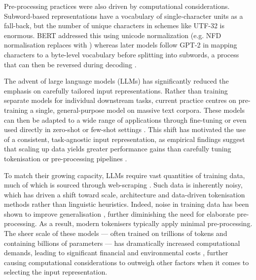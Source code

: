 Pre-processing practices were also driven by computational considerations. Subword-based representations have a vocabulary of single-character units as a fall-back, but the number of unique characters in schemes like UTF-32 is enormous. BERT addressed this using unicode normalization (e.g. NFD normalisation replaces  with ) whereas later models follow GPT-2 \citep{radford-2019-gpt2} in mapping characters to a byte-level vocabulary before splitting into subwords, a process that can then be reversed during decoding \citep{wang2020neural}.  

The advent of large language models (LLMs) has significantly reduced the emphasis on carefully tailored input representations. Rather than training separate models for individual downstream tasks, current practice centres on pre-training a single, general-purpose model on massive text corpora. These models can then be adapted to a wide range of applications through fine-tuning or even used directly in zero-shot or few-shot settings \citep{raffel2020exploring}. This shift has motivated the use of a consistent, task-agnostic input representation, as empirical findings suggest that scaling up data yields greater performance gains than carefully tuning tokenisation or pre-processing pipelines \citep{brown-2020-gpt3}. 

To match their growing capacity, LLMs require vast quantities of training data, much of which is sourced through web-scraping \citep{bansal-2022-datascaling}. Such data is inherently noisy, which has driven a shift toward scale, architecture and data-driven tokenisation methods rather than linguistic heuristics. Indeed, noise in training data has been shown to improve generalisation \citep{zheng-saparov-2023-noisy}, further diminishing the need for elaborate pre-processing. As a result, modern tokenisers typically apply minimal pre-processing. The sheer scale of these models --- often trained on trillions of tokens and containing billions of parameters --- has dramatically increased computational demands, leading to significant financial and environmental costs \citep{strubell-etal-2019-energy, patterson2021carbonemissionslargeneural, bender2021parrots, luccioni2022estimatingcarbonfootprintbloom}, further causing computational considerations to outweigh other factors when it comes to selecting the input representation. 


